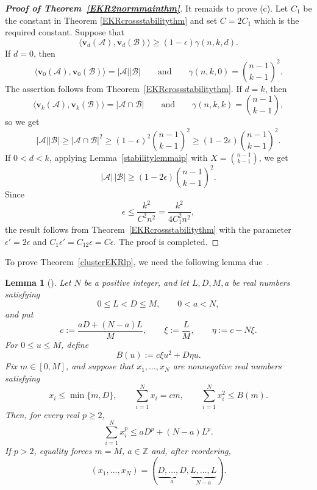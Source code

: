\documentclass[11pt]{article}
\numberwithin{equation}{section}
\newtheorem{lemma}[theorem]{Lemma}
\begin{document}
\begin{proof}[{\bf Proof of Theorem~\ref{EKR2normmainthm}}]
It remaids to prove (c).
Let $C_1$ be the constant in Theorem \ref{EKRcrossstabilitythm} and set
$C=2C_1$ which is the required constant.
Suppose that
\[
\big\langle\mathbf{v}_d(\mathcal{A}),
\mathbf{v}_d(\mathcal{B})\big\rangle
\geq(1-\epsilon)\gamma(n,k,d).
\]
If $d=0$, then
\[
  \bigl\langle \mathbf{v}_0(\mathcal A),\mathbf{v}_0(\mathcal B)\bigr\rangle
  =|\mathcal A||\mathcal B|
  \qquad\text{and}\qquad
  \gamma(n,k,0)=\binom{n-1}{k-1}^2.
\]
The assertion follows from Theorem~\ref{EKRcrossstabilitythm}.
If $d=k$, then
\[
  \bigl\langle \mathbf{v}_k(\mathcal A),\mathbf{v}_k(\mathcal B)\bigr\rangle
  =|\mathcal A\cap\mathcal B|
  \qquad\text{and}\qquad
  \gamma(n,k,k)=\binom{n-1}{k-1},
\]
so we get
\[
  |\mathcal A||\mathcal B|
  \geq |\mathcal A\cap\mathcal B|^2
  \geq(1-\epsilon)^2\binom{n-1}{k-1}^2
  \geq(1-2\epsilon)\binom{n-1}{k-1}^2.
\]
If $0<d<k$,
applying Lemma~\ref{stabilitylemmaip} with
$X=\binom{n-1}{k-1}$, we get
\[
|\mathcal{A}|\,|\mathcal{B}|
\geq(1-2\epsilon)\binom{n-1}{k-1}^2.
\]
Since
\[
\epsilon\leq\frac{k^2}{C^2n^2}
=\frac{k^2}{4C_1^2n^2},
\]
the result follows from Theorem~\ref{EKRcrossstabilitythm} with the parameter $\epsilon'=2\epsilon$ and $C_1\epsilon'= C_12\epsilon=C\epsilon$.
The proof is completed.
\end{proof}




To prove
Theorem~\ref{clusterEKRlp}, we need the following lemma due~\cite[Lemma 2.6]{Cao}.





\begin{lemma}[\cite{Cao}]\label{convextransferlem}
Let $N$ be a positive integer, and let $L,D,M,a$ be real numbers
satisfying
\[
0\leq L<D\leq M,
\qquad
0<a<N,
\]
and put
\[
c:=\frac{aD+(N-a)L}{M},
\qquad
\xi:=\frac LM,
\qquad
\eta:=c-N\xi.
\]
For $0\leq u\leq M$, define
\[
 B(u):=c\xi u^2+D\eta u.
\]
Fix $m\in[0,M]$, and suppose that $x_1,\ldots,x_N$ are nonnegative
real numbers satisfying
\begin{equation}\label{eq:abstract-envelope-assumptions}
x_i\leq\min\{m,D\},\qquad
\sum_{i=1}^N x_i=cm,\qquad
\sum_{i=1}^N x_i^2\leq  B(m).
\end{equation}
Then, for every real $p\geq2$,
\begin{equation}\label{eq:abstract-envelope}
\sum_{i=1}^N x_i^p
\leq
aD^p+(N-a)L^p.
\end{equation}
If $p>2$, equality forces $m=M$, $a\in\mathbb Z$ and, after
reordering,
\[
(x_1,\ldots,x_N)
=
(\underbrace{D,\ldots,D}_{a},
\underbrace{L,\ldots,L}_{N-a}).
\]
\end{lemma}
\end{document}
